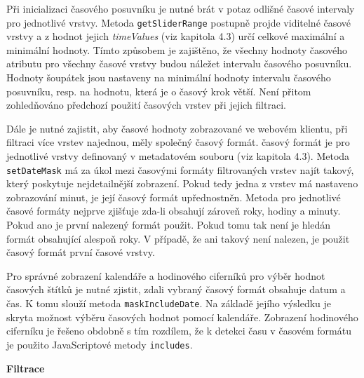 Při inicializaci časového posuvníku je nutné brát v potaz odlišné
časové intervaly pro jednotlivé vrstvy. Metoda \verb|getSliderRange|
postupně projde viditelné časové vrstvy a z hodnot
jejich \textit{timeValues} (viz kapitola 4.3) určí celkové maximální a
minimální hodnoty. Tímto způsobem je zajištěno, že všechny hodnoty
časového atributu pro všechny časové vrstvy budou náležet intervalu
časového posuvníku. Hodnoty šoupátek jsou nastaveny na minimální
hodnoty intervalu časového posuvníku, resp. na hodnotu, která je o
časový krok větší. Není přitom zohledňováno předchozí použití časových
vrstev při jejich filtraci.

Dále je nutné zajistit, aby časové hodnoty zobrazované ve webovém
klientu, při filtraci více vrstev najednou, měly společný časový
formát. časový formát je pro jednotlivé vrstvy definovaný v
metadatovém souboru (viz kapitola 4.3). Metoda \verb|setDateMask| má
za úkol mezi časovými formáty filtrovaných vrstev najít takový, který
poskytuje nejdetailnější zobrazení. Pokud tedy jedna z vrstev má
nastaveno zobrazování minut, je její časový formát
upřednostněn. Metoda pro jednotlivé časové formáty nejprve zjišťuje
zda-li obsahují zároveň roky, hodiny a minuty. Pokud ano je první
nalezený formát použit. Pokud tomu tak není je hledán formát
obsahující alespoň roky. V případě, že ani takový není nalezen, je
použit časový formát první časové vrstvy.

Pro správné zobrazení kalendáře a hodinového ciferníků pro výběr
hodnot časových štítků je nutné zjistit, zdali vybraný časový formát
obsahuje datum a čas. K tomu slouží metoda \verb|maskIncludeDate|. Na
základě jejího výsledku je skryta možnost výběru časových hodnot
pomocí kalendáře. Zobrazení hodinového ciferníku je řešeno obdobně s
tím rozdílem, že k detekci času v časovém formátu je použito
JavaScriptové metody \verb|includes|.

\bigskip
\noindent \textbf{Filtrace}


